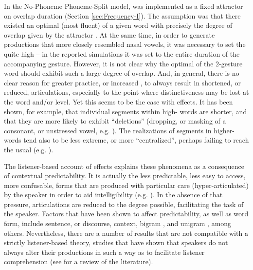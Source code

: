 In the No-Phoneme Phoneme-Split model,  was implemented as
a fixed attractor on overlap duration (Section \ref{sec:Frequency-I}).
The assumption was that there existed an optimal (most fluent) 
of a given word with precisely the degree of  overlap given
by the attractor . At the same time, in order to generate productions
that more closely resembled nasal vowels, it was necessary to set
the  quite high – in the reported simulations it was set to
the entire duration of the accompanying  gesture. However, it
is not clear why the optimal  of the 2-gesture word should
exhibit such a large degree of overlap. And, in general, there is
no clear reason for greater practice, or increased , to always
result in shortened, or reduced, articulations, especially to the
point where distinctiveness may be lost at the word and/or 
level. Yet this seems to be the case with  effects. It has
been shown, for example, that individual segments within high-
words are shorter, and that they are more likely to exhibit “deletions”
(dropping, or masking of a consonant, or unstressed vowel, e.g.
\citealt{Bell2003,Raymond2006,Bybee2008}). The realizations of segments
in higher- words tend also to be less extreme, or more “centralized”,
perhaps failing to reach the usual   (e.g. \citealt{munson2004effect,Scarborough2004,gahl2008time}).

The listener-based account of  effects explains these phenomena
as a consequence of contextual predictability. It is actually the
less predictable, less easy to access, more confusable, forms that
are produced with particular care (hyper-articulated) by the speaker
in order to aid intelligibility (e.g. \citealt{Aylett2004}). In
the absence of that pressure, articulations are reduced to the degree
possible, facilitating the task of the speaker. Factors that have
been shown to affect predictability, as well as word form, include
sentence, or discourse, context, bigram , and unigram ,
among others. Nevertheless, there are a number of results that are
not compatible with a strictly listener-based theory, studies that
have shown that speakers do not always alter their productions in
such a way as to facilitate listener comprehension (see \citealt{turnbull2015assessing}
for a review of the literature).


